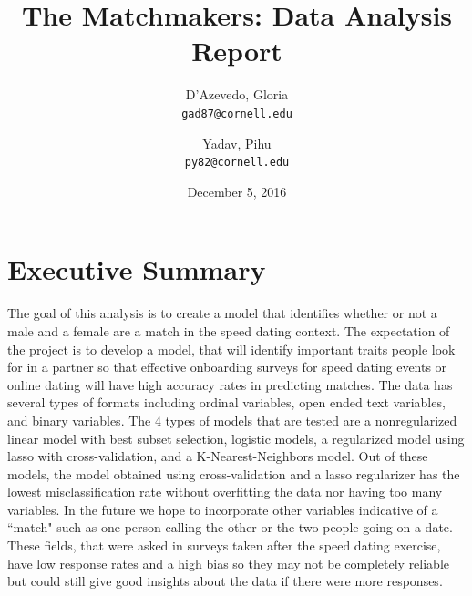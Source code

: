 \documentclass{article}
\title{The Matchmakers: Data Analysis Report}
\author{
  D'Azevedo, Gloria\\
  \texttt{gad87@cornell.edu}
  \and
  Yadav, Pihu\\
  \texttt{py82@cornell.edu}
}
\date{December 5, 2016}
\begin{document}
\maketitle

\section{Executive Summary}
The goal of this analysis is to create a model that identifies whether or not a male and a female are a match in the speed dating context. The expectation of the project is to develop a model, that will identify important traits people look for in a partner so that effective onboarding surveys for speed dating events or online dating will have high accuracy rates in predicting matches.  The data has several types of formats including ordinal variables, open ended text variables, and binary variables.  The 4 types of models that are tested are a nonregularized linear model with best subset selection, logistic models, a regularized model using lasso with cross-validation, and a K-Nearest-Neighbors model.  Out of these models, the model obtained using cross-validation and a lasso regularizer has the lowest misclassification rate without overfitting the data nor having too many variables.  In the future we hope to incorporate other variables indicative of a ``match" such as one person calling the other or the two people going on a date.  These fields, that were asked in surveys taken after the speed dating exercise, have low response rates and a high bias so they may not be completely reliable but could still give good insights about the data if there were more responses. 
\end{document}
